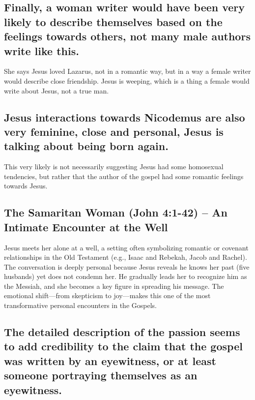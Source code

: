 \subsection{Finally, a woman writer would have been very likely to describe themselves based on the feelings towards others, not many male authors write like this.}\label{subsec:finally-a-woman-writer-would-have-been-very-likely-to-describe-themselves-based-on-the-feelings-towards-others-not-many-male-authors-write-like-this.}

She says Jesus loved Lazarus, not in a romantic way, but in a way a female writer would describe close friendship.
Jesus is weeping, which is a thing a female would write about Jesus, not a true man.

\subsection{Jesus interactions towards Nicodemus are also very feminine, close and personal, Jesus is talking about being born again.}\label{subsec:jesus-interactions-towards-nicodemus-are-also-very-feminine-close-and-personal-jesus-is-talking-about-being-born-again.}

This very likely is not necessarily suggesting Jesus had some homosexual tendencies, but rather that the author of the gospel had some romantic feelings towards Jesus.

\subsection{The Samaritan Woman (John 4:1-42) -- An Intimate Encounter at the Well}\label{subsec:the-samaritan-woman-john-41-42-an-intimate-encounter-at-the-well}

Jesus meets her alone at a well, a setting often symbolizing romantic or covenant relationships in the Old Testament (e.g., Isaac and Rebekah, Jacob and Rachel).
The conversation is deeply personal because Jesus reveals he knows her past (five husbands) yet does not condemn her.
He gradually leads her to recognize him as the Messiah, and she becomes a key figure in spreading his message.
The emotional shift---from skepticism to joy---makes this one of the most transformative personal encounters in the Gospels.

\subsection{The detailed description of the passion seems to add credibility to the claim that the gospel was written by an eyewitness, or at least someone portraying themselves as an eyewitness.}\label{subsec:the-detailed-description-of-the-passion-seems-to-add-credibility-to-the-claim-that-the-gospel-was-written-by-an-eyewitness-or-at-least-someone-portraying-themselves-as-an-eyewitness.}

